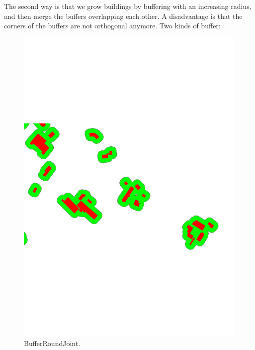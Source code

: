 \documentclass[graybox]{svmult}
\begin{document}
The second way is that we grow buildings by buffering with an 
increasing radius, and then merge the buffers overlapping each 
other. A disadvantage is that the corners of the buffers 
are not 
orthogonal anymore. Two kinds of buffer:


\begin{figure}[tb]
	\centering
	\includegraphics[width=\linewidth]{BufferRoundJoint}
	\caption{BufferRoundJoint.}
	\label{fig:BufferRoundJoint}
\end{figure}
\end{document}
